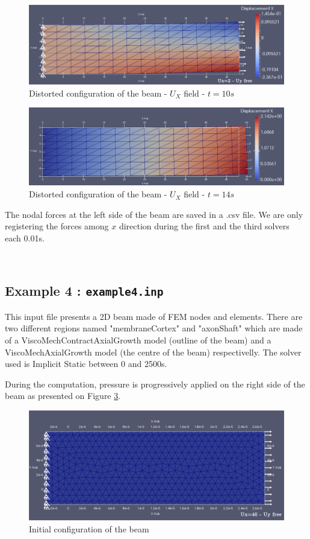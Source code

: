 \documentclass[oneside,11pt,times]{book}
\begin{document}
\begin{figure}[h!]
    \centering
    \includegraphics[scale=0.18]{imgs/Examples/ex3t10.png}
    \caption{Distorted configuration of the beam  -  $U_{X}$ field  -  $t=10s$}
    \label{ex3t10}
\end{figure}

\begin{figure}[htbp]
    \centering
    \includegraphics[scale=0.35]{imgs/Examples/ex3t14.png}
    \caption{Distorted configuration of the beam  -  $U_{X}$ field  -  $t=14s$}
    \label{ex3t14}
\end{figure}

The nodal forces at the left side of the beam are saved in a .csv file. We are only registering the forces among $x$ direction during the first and the third solvers each 0.01s.

\newpage
~
\newpage
\subsection{Example 4 : \texttt{example4.inp}}
This input file presents a 2D beam made of FEM nodes and elements. There are two different regions named "membraneCortex" and "axonShaft" which are made of a ViscoMechContractAxialGrowth model (outline of the beam) and a ViscoMechAxialGrowth model (the centre of the beam) respectivelly. The solver used is Implicit Static between 0 and 2500s.

During the computation, pressure is progressively applied on the right side of the beam as presented on Figure \ref{ex4-BC}.

\begin{figure}[h!]
    \centering
    \includegraphics[scale=0.19]{imgs/Examples/ex4-BC.png}
    \caption{Initial configuration of the beam}
    \label{ex4-BC}
\end{figure}
\end{document}
